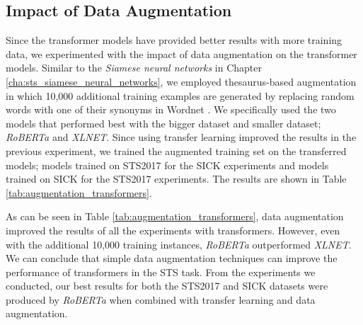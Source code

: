 \subsection{Impact of Data Augmentation}
\label{sec:transformer_aug}
Since the transformer models have provided better results with more training data, we experimented with the impact of data augmentation on the transformer models. Similar to the \textit{Siamese neural networks} in Chapter \ref{cha:sts_siamese_neural_networks}, we employed thesaurus-based augmentation in which 10,000 additional training examples are generated by replacing random words with one of their synonyms in Wordnet \autocite{10.1145/219717.219748}. We specifically used the two models that performed best with the bigger dataset and smaller dataset; \textit{RoBERTa} and \textit{XLNET}. Since using transfer learning improved the results in the previous experiment, we trained the augmented training set on the transferred models; models trained on STS2017 for the SICK experiments and models trained on SICK for the STS2017 experiments. The results are shown in Table \ref{tab:augmentation_transformers}. 

\begin{table}[htb]
	\centering
	\caption[Results for data augmentation with Transformers]{Results for data augmentation with different transformers. For each data augmentation experiment we show the difference between with dat augmentation and without data augmentation. For ease of visualisation we only report the Pearson correlation ($\bm{\rho}$).}  
	\label{tab:augmentation_transformers}
\end{table}

As can be seen in Table \ref{tab:augmentation_transformers}, data augmentation improved the results of all the experiments with transformers. However, even with the additional 10,000 training instances, \textit{RoBERTa} outperformed \textit{XLNET}. We can conclude that simple data augmentation techniques can improve the performance of transformers in the STS task. From the experiments we conducted, our best results for both the STS2017 and SICK datasets were produced by \textit{RoBERTa} when combined with transfer learning and data augmentation.


